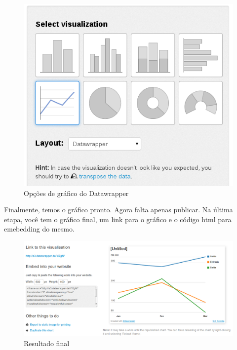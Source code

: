 \documentclass[12pt,onecolumn]{article}
\begin{document}
    \begin{figure}[H]
      \begin{center}
        \includegraphics[scale=0.4]{datawrapper-charts.png}
        \caption{Opções de gráfico do Datawrapper}
        \label{fig:datawrapper-charts}
      \end{center}
    \end{figure}
    
    Finalmente, temos o gráfico pronto. Agora falta apenas publicar. Na última etapa,
    você tem o gráfico final, um link para o gráfico e o código html para emebedding
    do mesmo.
    
    \begin{figure}[H]
      \begin{center}
        \includegraphics[width=.9\linewidth]{datawrapper-final.png}
        \caption{Resultado final}
        \label{fig:datawrapper-final}
      \end{center}
    \end{figure}
    
\end{document}
